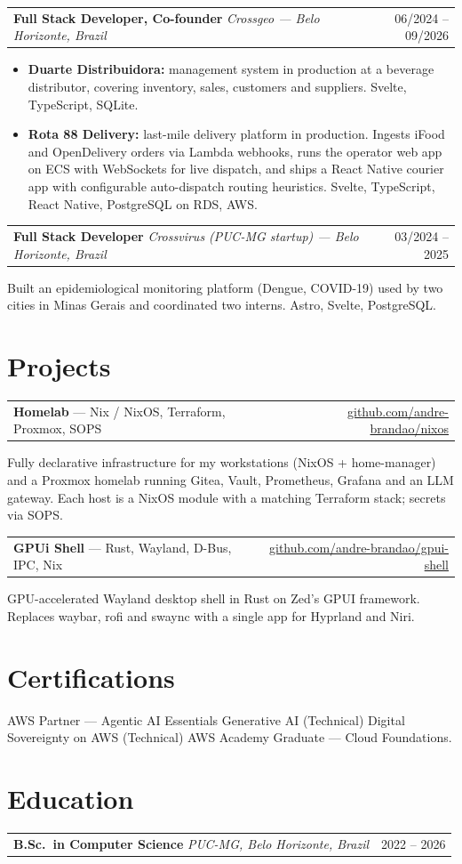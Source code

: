 \documentclass[10pt,a4paper]{article}
\makeatletter
\newcommand{\role}[4]{%
  \par\vspace{1pt}%
  \noindent\begin{tabular*}{\linewidth}[t]{@{}l@{\extracolsep{\fill}}r@{}}
    \textbf{#1} \textit{\textcolor{muted}{#2}} & \textcolor{muted}{#3} \\
  \end{tabular*}\par\nobreak
  \vspace{1pt}#4\par
}
\newcommand{\edu}[3]{%
  \par\vspace{1pt}%
  \noindent\begin{tabular*}{\linewidth}[t]{@{}l@{\extracolsep{\fill}}r@{}}
    \textbf{#1} \textit{\textcolor{muted}{#2}} & \textcolor{muted}{#3} \\
  \end{tabular*}\par
}
\newcommand{\project}[4]{%
  \par\vspace{1pt}%
  \noindent\begin{tabular*}{\linewidth}[t]{@{}l@{\extracolsep{\fill}}r@{}}
    \textbf{#1} \textcolor{muted}{--- #2} & \href{https://#3}{\textcolor{muted}{#3}} \\
  \end{tabular*}\par\nobreak
  #4\par
}
\makeatother
\begin{document}
\role{Full Stack Developer, Co-founder}{Crossgeo --- Belo Horizonte, Brazil}{06/2024 -- 09/2026}{
  \begin{itemize}
    \item \textbf{Duarte Distribuidora:} management system in production at a beverage
          distributor, covering inventory, sales, customers and suppliers.
          Svelte, TypeScript, SQLite.
    \item \textbf{Rota 88 Delivery:} last-mile delivery platform in production.
          Ingests iFood and OpenDelivery orders via Lambda webhooks, runs the operator
          web app on ECS with WebSockets for live dispatch, and ships a React
          Native courier app with configurable auto-dispatch routing heuristics.
          Svelte, TypeScript, React Native, PostgreSQL on RDS, AWS.
  \end{itemize}
}
\role{Full Stack Developer}{Crossvirus (PUC-MG startup) --- Belo Horizonte, Brazil}{03/2024 -- 2025}{
  Built an epidemiological monitoring platform (Dengue, COVID-19) used by two
  cities in Minas Gerais and coordinated two interns. Astro, Svelte, PostgreSQL.
}

\section*{Projects}
\project{Homelab}{Nix / NixOS, Terraform, Proxmox, SOPS}{github.com/andre-brandao/nixos}{
  Fully declarative infrastructure for my workstations (NixOS + home-manager) and
  a Proxmox homelab running Gitea, Vault, Prometheus, Grafana and an LLM gateway.
  Each host is a NixOS module with a matching Terraform stack; secrets via SOPS.
}

\project{GPUi Shell}{Rust, Wayland, D-Bus, IPC, Nix}{github.com/andre-brandao/gpui-shell}{
  GPU-accelerated Wayland desktop shell in Rust on Zed's GPUI framework. Replaces
  waybar, rofi and swaync with a single app for Hyprland and Niri.
}

\section*{Certifications}
AWS Partner --- Agentic AI Essentials \textbullet{} Generative AI (Technical) \textbullet{}
Digital Sovereignty on AWS (Technical) \textbullet{}
AWS Academy Graduate --- Cloud Foundations.

\section*{Education}
\edu{B.Sc.\ in Computer Science}{PUC-MG, Belo Horizonte, Brazil}{2022 -- 2026}
\end{document}
